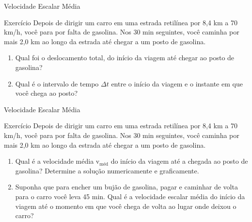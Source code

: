 \documentclass[xcolor=dvipsnames,table]{beamer}
\begin{document}
	\begin{frame}{Velocidade Escalar Média}
		\begin{block}{Exercício}
			Depois de dirigir um carro em uma estrada retilínea por	8,4 km a 70 km/h, você para por falta de gasolina. Nos 30 min seguintes, você caminha por mais 2,0 km ao longo da estrada até chegar a um posto de gasolina.
				\begin{enumerate} \pause
					\item Qual foi o deslocamento total, do início da viagem até chegar ao posto de gasolina? \pause
					\item Qual é o intervalo de tempo $\Delta t$ entre o início da viagem e o instante em que você chega ao posto? 
				\end{enumerate}
			
		\end{block}
	\end{frame}

	\begin{frame}{Velocidade Escalar Média}
		\begin{block}{Exercício}
			Depois de dirigir um carro em uma estrada retilínea por	8,4 km a 70 km/h, você para por falta de gasolina. Nos 30 min seguintes, você caminha por mais 2,0 km ao longo da estrada até chegar a um posto de gasolina.
			\begin{enumerate} \pause
				\setcounter{enumi}{2}
				\item Qual é a velocidade média v$_{\mbox{méd}}$ do início da viagem até a chegada ao posto de gasolina? Determine a solução numericamente e graficamente. \pause
				\item Suponha que para encher um bujão de gasolina, pagar e caminhar de volta para o carro você leva 45 min. Qual é a velocidade escalar média do início da viagem até o momento em que você chega de volta ao lugar onde deixou o carro?
			\end{enumerate}
		\end{block}
	\end{frame}
\end{document}
